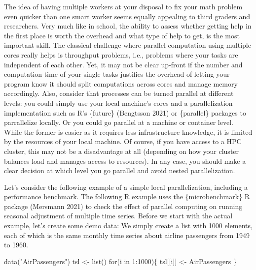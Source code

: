 \documentclass[
  12pt,
  letterpaper,
]{krantz}
\newenvironment{Shaded}{\begin{snugshade}}{\end{snugshade}}
\newcommand{\ControlFlowTok}[1]{\textcolor[rgb]{0.00,0.23,0.31}{#1}}
\newcommand{\DecValTok}[1]{\textcolor[rgb]{0.68,0.00,0.00}{#1}}
\newcommand{\FunctionTok}[1]{\textcolor[rgb]{0.28,0.35,0.67}{#1}}
\newcommand{\NormalTok}[1]{\textcolor[rgb]{0.00,0.23,0.31}{#1}}
\newcommand{\OtherTok}[1]{\textcolor[rgb]{0.00,0.23,0.31}{#1}}
\newcommand{\SpecialCharTok}[1]{\textcolor[rgb]{0.37,0.37,0.37}{#1}}
\newcommand{\StringTok}[1]{\textcolor[rgb]{0.13,0.47,0.30}{#1}}
\begin{document}
The idea of having multiple workers at your disposal to fix your math
problem even quicker than one smart worker seems equally appealing to
third graders and researchers. Very much like in school, the ability to
assess whether getting help in the first place is worth the overhead and
what type of help to get, is the most important skill. The classical
challenge where parallel computation using multiple cores really helps
is throughput problems, i.e., problems where your tasks are independent
of each other. Yet, it may not be clear up-front if the number and
computation time of your single tasks justifies the overhead of letting
your program know it should split computations across cores and manage
memory accordingly. Also, consider that processes can be turned parallel
at different levels: you could simply use your local machine's cores and
a parallelization implementation such as R's \{future\} (Bengtsson 2021)
or \{parallel\} packages to parrallelize locally. Or you could go
parallel at a machine or container level. While the former is easier as
it requires less infrastructure knowledge, it is
limited by the resources of your local machine. Of course, if you have
access to a HPC cluster, this may not be a disadvantage at all
(depending on how your cluster balances load and manages access to
resources). In any case, you should make a clear decision at which level
you go parallel and avoid nested parallelization.

Let's consider the following example of a simple local parallelization,
including a performance benchmark. The following R example uses the
\{microbenchmark\} R package (Mersmann 2021) to check the effect of
parallel computing on running seasonal adjustment of multiple time
series. Before we start with the actual example,
let's create some demo data: We simply create a list with 1000 elements,
each of which is the same monthly time series about
airline passengers from 1949 to 1960.

\begin{Shaded}
\begin{Highlighting}[]
\FunctionTok{data}\NormalTok{(}\StringTok{"AirPassengers"}\NormalTok{)}
\NormalTok{tsl }\OtherTok{\textless{}{-}} \FunctionTok{list}\NormalTok{()}
\ControlFlowTok{for}\NormalTok{(i }\ControlFlowTok{in} \DecValTok{1}\SpecialCharTok{:}\DecValTok{1000}\NormalTok{)\{}
\NormalTok{  tsl[[i]] }\OtherTok{\textless{}{-}}\NormalTok{ AirPassengers}
\NormalTok{\}}
\end{Highlighting}
\end{Shaded}
\end{document}
